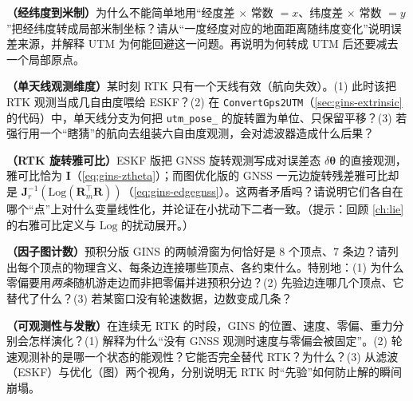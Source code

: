 \begin{exercise}
\label{ex:gins-utm}
\textbf{（经纬度到米制）}\;为什么不能简单地用“经度差 $\times$ 常数 $= x$、纬度差 $\times$ 常数 $= y$”把经纬度转成局部米制坐标？请从“一度经度对应的地面距离随纬度变化”说明误差来源，并解释 UTM 为何能回避这一问题。再说明为何转成 UTM 后还要减去一个局部原点。
\end{exercise}

\begin{exercise}
\label{ex:gins-antenna}
\textbf{（单天线观测维度）}\;某时刻 RTK 只有一个天线有效（航向失效）。(1) 此时该把 RTK 观测当成几自由度喂给 ESKF？(2) 在 \texttt{ConvertGps2UTM}（\cref{sec:gins-extrinsic} 的代码）中，单天线分支为何把 \texttt{utm\_pose\_} 的旋转置为单位、只保留平移？(3) 若强行用一个“瞎猜”的航向去组装六自由度观测，会对滤波器造成什么后果？
\end{exercise}

\begin{exercise}
\label{ex:gins-jacobian}
\textbf{（RTK 旋转雅可比）}\;ESKF 版把 GNSS 旋转观测写成对误差态 $\delta\boldsymbol{\theta}$ 的直接观测，雅可比恰为 $\mathbf{I}$（\cref{eq:gins-ztheta}）；而图优化版的 GNSS 一元边旋转残差雅可比却是 $\mathbf{J}_r^{-1}(\mathrm{Log}(\mathbf{R}_m^\top\mathbf{R}))$（\cref{eq:gins-edgegnss}）。这两者矛盾吗？请说明它们各自在哪个“点”上对什么变量线性化，并论证在小扰动下二者一致。（提示：回顾 \cref{ch:lie} 的右雅可比定义与 $\mathrm{Log}$ 的扰动展开。）
\end{exercise}

\begin{exercise}
\label{ex:gins-graph}
\textbf{（因子图计数）}\;预积分版 GINS 的两帧滑窗为何恰好是 $8$ 个顶点、$7$ 条边？请列出每个顶点的物理含义、每条边连接哪些顶点、各约束什么。特别地：(1) 为什么零偏要用\emph{两条}随机游走边而非把零偏并进预积分边？(2) 先验边连哪几个顶点、它替代了什么？(3) 若某窗口没有轮速数据，边数变成几条？
\end{exercise}

\begin{exercise}
\label{ex:gins-observability}
\textbf{（可观测性与发散）}\;在连续无 RTK 的时段，GINS 的位置、速度、零偏、重力分别会怎样演化？(1) 解释为什么“没有 GNSS 观测时速度与零偏会被固定”。(2) 轮速观测补的是哪一个状态的能观性？它能否完全替代 RTK？为什么？(3) 从滤波（ESKF）与优化（图）两个视角，分别说明无 RTK 时“先验”如何防止解的瞬间崩塌。
\end{exercise}
